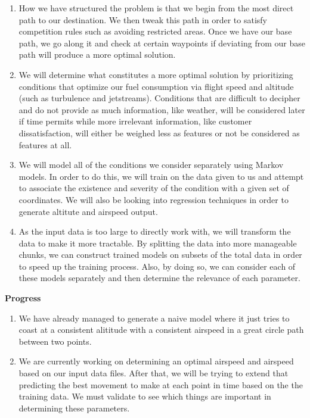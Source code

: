 \documentclass{article}[9pt]
\begin{document}
\begin{enumerate}
    \item How we have structured the problem is that we begin from the most direct path to our destination. We then tweak this path in order to satisfy competition rules such as avoiding restricted areas. Once we have our base path, we go along it and check at certain waypoints if deviating from our base path will produce a more optimal solution. 
    \item We will determine what constitutes a more optimal solution by prioritizing conditions that optimize our fuel consumption via flight speed and altitude (such as turbulence and jetstreams). Conditions that are difficult to decipher and do not provide as much information, like weather, will be considered later if time permits while more irrelevant information, like customer dissatisfaction, will either be weighed less as features or not be considered as features at all.
    \item We will model all of the conditions we consider separately using Markov models. In order to do this, we will train on the data given to us and attempt to associate the existence and severity of the condition with a given set of coordinates. We will also be looking into regression techniques in order to generate altitute and airspeed output.
    \item As the input data is too large to directly work with, we will transform the data to make it more tractable. By splitting the data into more manageable chunks, we can construct trained models on subsets of the total data in order to speed up the training process. Also, by doing so, we can consider each of these models separately and then determine the relevance of each parameter. 
\end{enumerate}
\noindent
\Large{\textbf{Progress}}
\begin{enumerate}
		\item We have already managed to generate a naive model where it just tries to coast at a consistent alititude with a consistent airspeed in a great circle path between two points.
		\item We are currently working on determining an optimal airspeed and airspeed based on our input data files. After that, we will be trying to extend that predicting the best movement to make at each point in time based on the the training data. We must validate to see which things are important in determining these parameters.
\end{enumerate}
\end{document}
